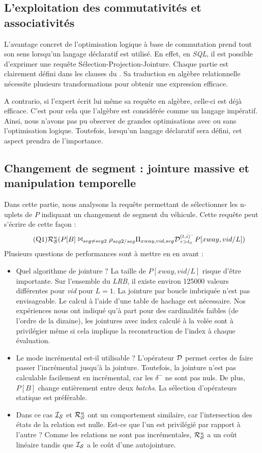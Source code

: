 \subsection{L'exploitation des commutativités et associativités}
L'avantage concret de l'optimisation logique à base de commutation prend tout son sens lorsqu'un langage déclaratif est utilisé. En effet, en \textit{SQL}, il est possible d'exprimer une requête Sélection-Projection-Jointure. Chaque partie est clairement défini dans les clauses du . Sa traduction en algèbre relationnelle nécessite plusieurs transformations pour obtenir une expression efficace.

A contrario, si l'expert écrit lui même sa requête en algèbre, celle-ci est déjà efficace. C'est pour cela que l'algèbre est considérée comme un langage impératif. Ainsi, nous n'avons pas pu observer de grandes optimisations avec ou sans l'optimisation logique. Toutefois, lorsqu'un langage déclaratif sera défini, cet aspect prendra de l'importance.

\subsection{Changement de segment : jointure massive et manipulation temporelle}\label{sec:valid:perfs:flux:segchange}
Dans cette partie, nous analysons la requête permettant de sélectionner les n-uplets de $P$ indiquant un changement de segment du véhicule. Cette requête peut s'écrire de cette façon : 
\begin{equation}
  \tag{Q1}
\mathcal{R}_{\mathcal S}^{u}(P[B] \Join_{seg\neq seg2} \rho_{seg2/seg} \Pi_{xway,vid,seg} \mathcal{D}^{(t,i)^-}_{\tau>t_0} P[xway,vid/L])
\end{equation}
Plusieurs questions de performances sont à mettre en en avant :
\begin{itemize}
	\item Quel algorithme de jointure ? La taille de $P[xway,vid/L]$ risque d'être importante. Sur l'ensemble du \textit{LRB}, il existe environ 125000 valeurs différentes pour \textit{vid} pour $L=1$. La jointure par boucle imbriquée n'est pas envisageable. Le calcul à l'aide d'une table de hachage est nécessaire. Nos expériences nous ont indiqué qu'à part pour des cardinalités faibles (de l'ordre de la dizaine), les jointures avec index calculé à la volée sont à privilégier même si cela implique la reconstruction de l'index à chaque évaluation.
	\item Le mode incrémental est-il utilisable ? L'opérateur $\mathcal{D}$ permet certes de faire passer l'incrémental jusqu'à la jointure. Toutefois, la jointure n'est pas calculable facilement en incrémental, car les $\delta^-$ ne sont pas nuls. De plus, $P[B]$ change entièrement entre deux \textit{batchs}. La sélection d'opérateurs statique est préférable.
	\item Dans ce cas $\mathcal{I_S}$ et $\mathcal{R}_{\mathcal S}^{u}$ ont un comportement similaire, car l'intersection des états de la relation est nulle. Est-ce que l'un est privilégié par rapport à l'autre ? Comme les relations ne sont pas incrémentales, $\mathcal{R}_{\mathcal S}^{u}$ a un coût linéaire tandis que $\mathcal{I_S}$ a le coût d'une autojointure.
\end{itemize}

